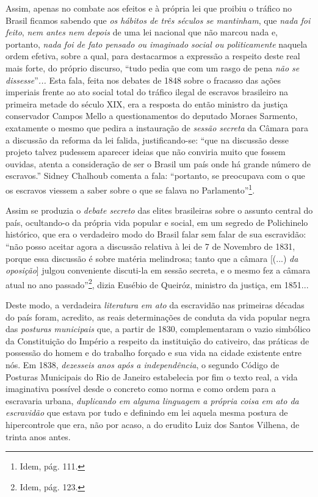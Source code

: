 Assim, apenas no combate aos efeitos e à própria lei que proibiu o
tráfico no Brasil ficamos sabendo que \emph{os hábitos de três séculos
se mantinham}, que \emph{nada foi feito}, \emph{nem antes nem depois} de
uma lei nacional que não marcou nada e, portanto, \emph{nada foi de fato
pensado ou imaginado social ou politicamente} naquela ordem efetiva,
sobre a qual, para destacarmos a expressão a respeito deste real mais
forte, do próprio discurso, ``tudo pedia que com um rasgo de pena
\emph{não se dissesse}''\emph{...} Esta fala, feita nos debates de 1848
sobre o fracasso das ações imperiais frente ao ato social total do
tráfico ilegal de escravos brasileiro na primeira metade do século XIX,
era a resposta do então ministro da justiça conservador Campos Mello a
questionamentos do deputado Moraes Sarmento, exatamente o mesmo que
pedira a instauração de \emph{sessão secreta} da Câmara para a discussão
da reforma da lei falida, justificando-se: ``que na discussão desse
projeto talvez pudessem aparecer ideias que não conviria muito que
fossem ouvidas, atenta a consideração de ser o Brasil um país onde há
grande número de escravos.'' Sidney Chalhoub comenta a fala: ``portanto,
se preocupava com o que os escravos viessem a saber sobre o que se
falava no Parlamento''\footnote{Idem, pág. 111.}.

Assim se produzia o \emph{debate secreto} das elites brasileiras sobre o
assunto central do país, ocultando-o da própria vida popular e social,
em um segredo de Polichinelo histórico, que era o verdadeiro modo do
Brasil falar sem falar de sua escravidão: ``não posso aceitar agora a
discussão relativa à lei de 7 de Novembro de 1831, porque essa discussão
é sobre matéria melindrosa; tanto que a câmara {[}(...) \emph{da
oposição}{]} julgou conveniente discuti-la em sessão secreta, e o mesmo
fez a câmara atual no ano passado''\footnote{Idem, pág. 123.}, dizia
Eusébio de Queiróz, ministro da justiça, em 1851...

Deste modo, a verdadeira \emph{literatura} \emph{em ato} da escravidão
nas primeiras décadas do país foram, acredito, as reais determinações de
conduta da vida popular negra das \emph{posturas municipais} que, a
partir de 1830, complementaram o vazio simbólico da Constituição do
Império a respeito da instituição do cativeiro, das práticas de
possessão do homem e do trabalho forçado e sua vida na cidade existente
entre nós. Em 1838, \emph{dezesseis anos após a independência}, o
segundo Código de Posturas Municipais do Rio de Janeiro estabelecia por
fim o texto real, a vida imaginativa possível desde o concreto como
norma e como ordem para a escravaria urbana, \emph{duplicando em alguma
linguagem a própria coisa em ato da escravidão} que estava por tudo e
definindo em lei aquela mesma postura de hipercontrole que era, não por
acaso, a do erudito Luiz dos Santos Vilhena, de trinta anos antes.

